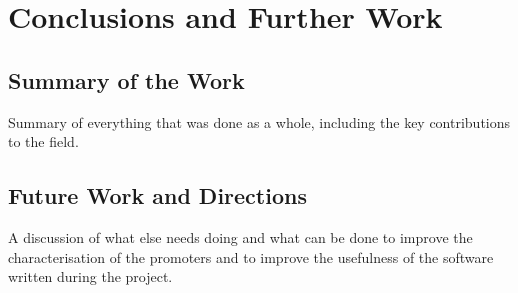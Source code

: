 
\chapter{Conclusions and Further Work}
\label{chap:Conclusions} 

\section{Summary of the Work}

Summary of everything that was done as a whole, including the key contributions
to the field.

\section{Future Work and Directions}

A discussion of what else needs doing and what can be done to improve the
characterisation of the promoters and to improve the usefulness of the software
written during the project.
